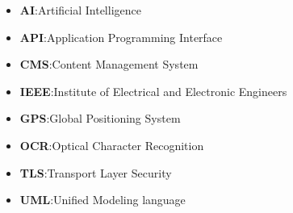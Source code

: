 \begin{itemize}
	\item \textbf{AI}:\@ Artificial Intelligence
	\item \textbf{API}:\@ Application Programming Interface
	\item \textbf{CMS}:\@ Content Management System
	\item \textbf{IEEE}:\@ Institute of Electrical and Electronic Engineers
	\item \textbf{GPS}:\@ Global Positioning System
	\item \textbf{OCR}:\@ Optical Character Recognition
	\item \textbf{TLS}:\@ Transport Layer Security
	\item \textbf{UML}:\@ Unified Modeling language
\end{itemize}